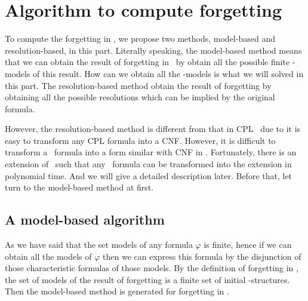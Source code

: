 \documentclass{article}
\begin{document}
\section{Algorithm to compute forgetting}
To compute the forgetting in \CTL, we propose two methods, model-based and resolution-based, in this part.
Literally speaking, the model-based method means that we can obtain the result of forgetting in \CTL\ by obtain all the possible finite \MPK-models of this result. How can we obtain all the \MPK-models is what we will solved in this part.
The resolution-based method obtain the result of forgetting by obtaining all the possible resolutions which can be implied by the original formula.

However, the resolution-based method is different from that in CPL~\cite{Yisong:2015:arx} due to it is easy to transform any CPL formula into a CNF.
However, it is difficult to transform a \CTL\ formula into a form similar with CNF in \CTL.
Fortunately, there is an extension of \CTL\ such that any \CTL\ formula can be transformed into the extension in polynomial time.
And we will give a detailed description later. Before that,  let turn to the model-based method at first.
\subsection{A model-based algorithm}
As we have said that the set models of any formula $\varphi$ is finite, hence if we can obtain all the models of $\varphi$ then we can express this formula by the disjunction of those characteristic formulas of those models.
By the definition of forgetting in \CTL, the set of models of the result of forgetting is a finite set of initial \MPK-structures.
Then the model-based method is generated for forgetting in \CTL.
\end{document}
